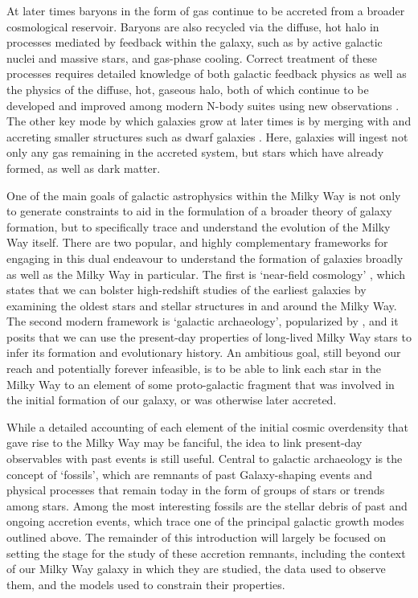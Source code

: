 At later times baryons in the form of gas continue to be accreted from a broader cosmological reservoir. Baryons are also recycled via the diffuse, hot halo in processes mediated by feedback within the galaxy, such as by active galactic nuclei and massive stars, and gas-phase cooling. Correct treatment of these processes requires detailed knowledge of both galactic feedback physics as well as the physics of the diffuse, hot, gaseous halo, both of which continue to be developed and improved among modern N-body suites using new observations \parencite[see][]{crain23}. The other key mode by which galaxies grow at later times is by merging with and accreting smaller structures such as dwarf galaxies \parencite{lacey93}. Here, galaxies will ingest not only any gas remaining in the accreted system, but stars which have already formed, as well as dark matter.

One of the main goals of galactic astrophysics within the Milky Way is not only to generate constraints to aid in the formulation of a broader theory of galaxy formation, but to specifically trace and understand the evolution of the Milky Way itself. There are two popular, and highly complementary frameworks for engaging in this dual endeavour to understand the formation of galaxies broadly as well as the Milky Way in particular. The first is `near-field cosmology' \parencite{bland-hawthorn99,frebel15}, which states that we can bolster high-redshift studies of the earliest galaxies by examining the oldest stars and stellar structures in and around the Milky Way. The second modern framework is `galactic archaeology', popularized by \textcite{freeman02}, and it posits that we can use the present-day properties of long-lived Milky Way stars to infer its formation and evolutionary history. An ambitious goal, still beyond our reach and potentially forever infeasible, is to be able to link each star in the Milky Way to an element of some proto-galactic fragment that was involved in the initial formation of our galaxy, or was otherwise later accreted.

While a detailed accounting of each element of the initial cosmic overdensity that gave rise to the Milky Way may be fanciful, the idea to link present-day observables with past events is still useful. Central to galactic archaeology is the concept of `fossils', which are remnants of past Galaxy-shaping events and physical processes that remain today in the form of groups of stars or trends among stars. Among the most interesting fossils are the stellar debris of past and ongoing accretion events, which trace one of the principal galactic growth modes outlined above. The remainder of this introduction will largely be focused on setting the stage for the study of these accretion remnants, including the context of our Milky Way galaxy in which they are studied, the data used to observe them, and the models used to constrain their properties.